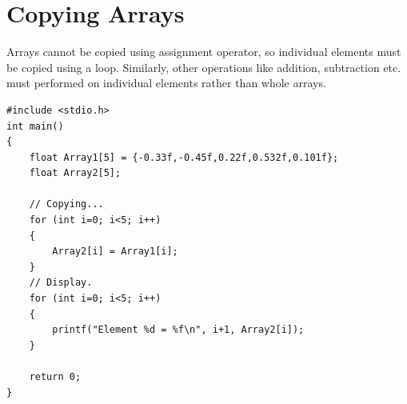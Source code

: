 \documentclass{article}
\begin{document}
\section{Copying Arrays}
Arrays cannot be copied using assignment operator, so individual elements must be copied using a loop. Similarly, other operations like addition, subtraction etc. must performed on individual elements rather than whole arrays.
\begin{lstlisting}[caption={Copying an array}]
#include <stdio.h>
int main()
{
    float Array1[5] = {-0.33f,-0.45f,0.22f,0.532f,0.101f};
    float Array2[5];

    // Copying...
    for (int i=0; i<5; i++)
    {
        Array2[i] = Array1[i];
    }
    // Display.
    for (int i=0; i<5; i++)
    {
        printf("Element %d = %f\n", i+1, Array2[i]);
    }

    return 0;
}
\end{lstlisting}
\end{document}
